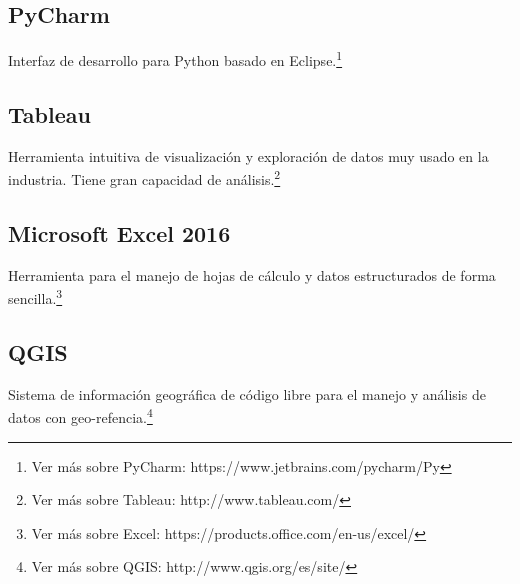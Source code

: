 \subsection{PyCharm}
Interfaz de desarrollo para Python basado en Eclipse.\footnote{Ver más sobre PyCharm: https://www.jetbrains.com/pycharm/Py}
\subsection{Tableau}
Herramienta intuitiva de visualización y exploración de datos muy usado en la industria. Tiene gran capacidad de análisis.\footnote{Ver más sobre Tableau: http://www.tableau.com/}
\subsection{Microsoft Excel 2016}
Herramienta para el manejo de hojas de cálculo y datos estructurados de forma sencilla.\footnote{Ver más sobre Excel: https://products.office.com/en-us/excel/}
\subsection{QGIS}
Sistema de información geográfica de código libre para el manejo y análisis de datos con geo-refencia.\footnote{Ver más sobre QGIS: http://www.qgis.org/es/site/}